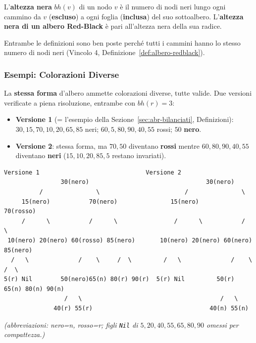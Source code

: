 \documentclass[12pt, a4paper]{article}
\begin{document}
\begin{tcolorbox}[colback=lightergray!10, colframe=tocsec, title=\textbf{Definizione: Altezza Nera}]
\label{def:altezza-nera}
L'\textbf{altezza nera} $bh(v)$ di un nodo $v$ è il numero di nodi neri lungo ogni cammino da $v$ (\textbf{escluso}) a ogni foglia (\textbf{inclusa}) del suo sottoalbero. L'\textbf{altezza nera di un albero Red-Black} è pari all'altezza nera della sua radice.
\end{tcolorbox}

Entrambe le definizioni sono ben poste perché tutti i cammini hanno lo stesso numero di nodi neri (Vincolo 4, Definizione~\ref{def:albero-redblack}).

\subsubsection{Esempi: Colorazioni Diverse}

\begin{tcolorbox}[colback=lightergray!5, colframe=tocsubsec, title=\textbf{Più Colorazioni Sono Possibili}]
La \textbf{stessa forma} d'albero ammette colorazioni diverse, tutte valide. Due versioni verificate a piena risoluzione, entrambe con $bh(r)=3$:
\begin{itemize}
    \item \textbf{Versione 1} (= l'esempio della Sezione~\ref{sec:abr-bilanciati}, Definizioni): $30,15,70,10,20,65,85$ neri; $60,5,80,90,40,55$ rossi; $50$ \textbf{nero}.
    \item \textbf{Versione 2}: stessa forma, ma $70,50$ diventano \textbf{rossi} mentre $60,80,90,40,55$ diventano \textbf{neri} ($15,10,20,85,5$ restano invariati).
\end{itemize}
\end{tcolorbox}

\begin{verbatim}
Versione 1                              Versione 2
                30(nero)                                 30(nero)
          /               \                        /               \
     15(nero)           70(nero)               15(nero)           70(rosso)
     /      \           /      \                /      \           /      \
 10(nero) 20(nero) 60(rosso) 85(nero)       10(nero) 20(nero) 60(nero)  85(nero)
  /   \              /    \     /  \         /   \              /    \     /  \
5(r) Nil        50(nero)65(n) 80(r) 90(r)  5(r) Nil         50(r) 65(n) 80(n) 90(n)
                 /   \                                       /   \
              40(r) 55(r)                                 40(n) 55(n)
\end{verbatim}
\textit{(abbreviazioni: nero=n, rosso=r; figli \texttt{Nil} di $5,20,40,55,65,80,90$ omessi per compattezza.)}
\end{document}
